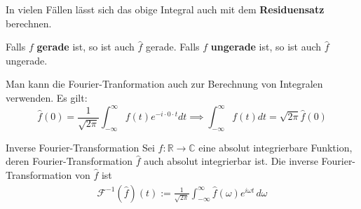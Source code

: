 \documentclass[a4paper,10pt]{article}
\begin{document}
In vielen Fällen lässt sich das obige Integral auch mit dem \textbf{Residuensatz} berechnen.

Falls $f$ \textbf{gerade} ist, so ist auch $\hat{f}$ gerade. Falls $f$ \textbf{ungerade} ist, so ist auch $\hat{f}$ ungerade.

Man kann die Fourier-Tranformation auch zur Berechnung von Integralen verwenden. Es gilt:
$$
\hat{f}(0) = \frac{1}{\sqrt{2\pi}} \int_{-\infty}^\infty f(t) e^{-i\cdot 0 \cdot t} dt \implies  \int_{-\infty}^\infty f(t) dt = \sqrt{2\pi} \hat{f}(0)
$$

\begin{mainbox}{Inverse Fourier-Transformation}
  Sei \(f\colon\mathbb{R}\to\mathbb{C}\) eine absolut integrierbare Funktion, deren Fourier-Transformation \(\hat f\) auch absolut integrierbar ist. Die inverse Fourier-Transformation von \(\hat f\) ist \begin{align*} \mathcal F^{-1}(\hat f)(t):=\frac{1}{\sqrt{2\pi}}\int_{-\infty}^\infty \hat f(\omega)e^{ i\omega t}\,d\omega \end{align*}
\end{mainbox}
\end{document}
